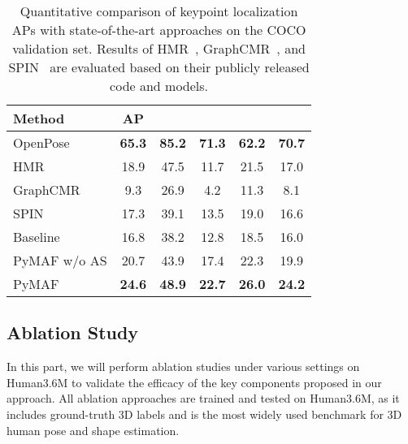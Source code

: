 \documentclass[10pt,twocolumn,letterpaper]{article}
\begin{document}
\begin{table}[t]
 \footnotesize
  \centering
    \begin{tabular}{l|ccccc}
    \toprule
    Method & AP    &  &  &  &  \\
    \midrule
    OpenPose~\cite{cao2019openpose} & \textbf{65.3}  & \textbf{85.2}  & \textbf{71.3}  & \textbf{62.2}  & \textbf{70.7} \\
    \midrule
    HMR~\cite{kanazawa2018end} & 18.9  & 47.5  & 11.7  & 21.5  & 17.0 \\
    GraphCMR~\cite{kolotouros2019convolutional} & 9.3   & 26.9  & 4.2   & 11.3  & 8.1 \\
    SPIN~\cite{kolotouros2019learning} & 17.3  & 39.1  & 13.5  & 19.0    & 16.6 \\
    \midrule
    Baseline & 16.8  & 38.2  & 12.8  & 18.5  & 16.0   \\
    PyMAF w/o AS & 20.7  & 43.9  & 17.4  & 22.3  & 19.9  \\
    PyMAF & \textbf{24.6} & \textbf{48.9} & \textbf{22.7} & \textbf{26.0} & \textbf{24.2} \\
    \bottomrule
    \end{tabular}\caption{Quantitative comparison of keypoint localization APs with state-of-the-art approaches on the COCO validation set. Results of HMR~\cite{kanazawa2018end}, GraphCMR~\cite{kolotouros2019convolutional}, and SPIN~\cite{kolotouros2019learning} are evaluated based on their publicly released code and models.}
    \vspace{-5mm}
  \label{tab:coco}\end{table}



\subsection{Ablation Study}
In this part, we will perform ablation studies under various settings on Human3.6M to validate the efficacy of the key components proposed in our approach.
All ablation approaches are trained and tested on Human3.6M, as it includes ground-truth 3D labels and is the most widely used benchmark for 3D human pose and shape estimation.
\end{document}
